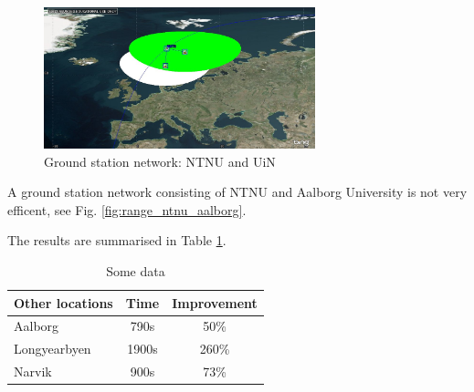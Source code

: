 \begin{figure}
  \begin{center}
    \includegraphics[width=0.7\textwidth]{Figures/range_ntnu_narvik}
  \end{center}
  \caption{Ground station network: NTNU and UiN}
  \label{fig:range_ntnu_unis}
\end{figure}


A ground station network consisting of NTNU and Aalborg University is not very efficent, see Fig. \ref{fig:range_ntnu_aalborg}. 
 


The results are summarised in Table \ref{tab:networks}.

\begin{table}
\begin{center}
\begin{tabular}{l | c c}
  Other locations & Time & Improvement \\
\hline \hline
  Aalborg & 790s &  50\% \\
\hline
  Longyearbyen & 1900s & 260\% \\
\hline
  Narvik & 900s & 73\%  \\
\end{tabular}
\end{center}
\caption{Some data}
\label{tab:networks}
\end{table}